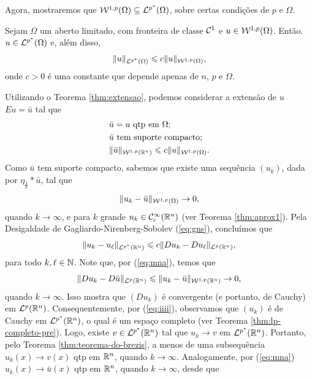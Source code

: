 Agora, mostraremos que $\mathcal{W}^{1,p}(\Omega) \subseteq \mathcal{L}^{p^*}(\Omega)$, sobre certas condições de $p$ e $\Omega$.

\begin{tbox} \label{thm:desigualdade-teorema-2}
    Sejam $\Omega$ um aberto limitado, com fronteira de classe $\mathcal{C}^1$ e $u \in \mathcal{W}^{1,p}(\Omega)$. Então. $u \in \mathcal{L}^{p^*}(\Omega)$ e, além disso,
    \[
        \Vert u \Vert_{\mathcal{L}^{p^*}(\Omega)} \leqslant c \Vert u \Vert_{\mathcal{W}^{1,p}(\Omega)},
    \]
    onde $c > 0$ é uma constante que depende apenas de $n$, $p$ e $\Omega$.
\end{tbox}
\begin{prf}
    Utilizando o Teorema \ref{thm:extensao}, podemos considerar a extensão de $u$ $Eu = \bar u$ tal que
    \begin{equation} \label{eq:man}
        \begin{aligned}
            &\bar u = u \text{ qtp em } \Omega;\\
            &\bar u \text{ tem suporte compacto};\\
            &\Vert \bar u \Vert_{\mathcal{W}^{1,p}(\mathbb{R}^n)} \leqslant c\Vert u \Vert_{\mathcal{W}^{1,p}(\Omega)}.
        \end{aligned}
    \end{equation}
    Como $\bar u$ tem suporte compacto, sabemos que existe uma sequência $(u_k)$, dada por $\eta_{\frac{1}{k}} * \bar u$, tal que
    \begin{equation} \label{eq:mna}
        \Vert u_k - \bar u \Vert_{\mathcal{W}^{1,p}(\Omega)} \to 0,
    \end{equation}
    quando $k \to \infty$,
    e para $k$ grande $u_k \in \mathcal{C}^{\infty}_c(\mathbb{R}^n)$ (ver Teorema \ref{thm:aprox1}).
    Pela Desigaldade de Gagliardo-Nirenberg-Sobolev (\ref{eq:gns}), concluímos que
    \begin{equation} \label{eq:iiii}
        \Vert u_k - u_\ell \Vert_{\mathcal{L}^{p^*}(\mathbb{R}^n)} \leqslant c \Vert Du_k - Du_\ell \Vert_{\mathcal{L}^p(\mathbb{R}^n)},
    \end{equation}
    para todo $k, \ell \in \mathbb{N}$.
    Note que, por (\ref{eq:mna}), temos que
    \begin{equation} \label{eq:jjj}
        \Vert Du_k - D\bar u \Vert_{\mathcal{L}^p(\mathbb{R}^n)} \leqslant \Vert u_k - \bar u \Vert_{\mathcal{W}^{1,p}(\mathbb{R}^n)} \to 0, 
    \end{equation}
    quando $k \to \infty$.
    Isso mostra que $(Du_k)$ é convergente (e portanto, de Cauchy) em $\mathcal{L}^p(\mathbb{R}^n)$.
    Consequentemente, por (\ref{eq:iiii}), observamos que $(u_k)$ é de Cauchy em $\mathcal{L}^{p^*}(\mathbb{R}^n)$, o qual é um espaço completo (ver Teorema \ref{thm:lp-completo-pre}). Logo, existe $v \in \mathcal{L}^{p^*}(\mathbb{R}^n)$ tal que $u_k \to v$ em $\mathcal{L}^{p^*}(\mathbb{R}^n)$. Portanto, pelo Teorema \ref{thm:teorema-do-brezis}, a menos de uma subsequência $u_k(x) \to v(x)$ qtp em $\mathbb{R}^n$, quando $k \to \infty$. Analogamente, por (\ref{eq:mna}) $u_k(x) \to \bar u(x)$ qtp em $\mathbb{R}^n$, quando $k \to \infty$, desde que

\end{prf}
